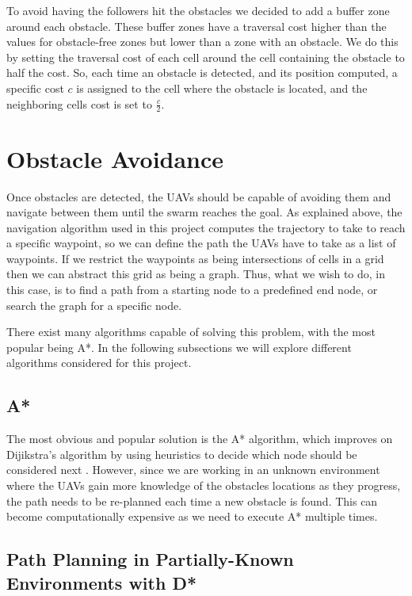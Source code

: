 To avoid having the followers hit the obstacles we decided to add a buffer zone around each obstacle. 
These buffer zones have a traversal cost higher than the values for obstacle-free zones but lower than
a zone with an obstacle. We do this by setting the traversal cost of each cell around the cell containing
the obstacle to half the cost. So, each time an obstacle is detected, and its position computed, a specific
cost $c$ is assigned to the cell where the obstacle is located, and the neighboring cells cost is set to 
$\frac{c}{2}$.

\section{Obstacle Avoidance}

Once obstacles are detected, the UAVs should be capable of avoiding them and navigate between them 
until the swarm reaches the goal. As explained above, the navigation algorithm used in this project computes
the trajectory to take to reach a specific waypoint, so we can define the path the UAVs have to take
as a list of waypoints. If we restrict the waypoints as being intersections of cells in a grid then
we can abstract this grid as being a graph. Thus, what we wish to do, in this case, is to find a path
from a starting node to a predefined end node, or search the graph for a specific node. 

There exist many algorithms capable of solving this problem, with the most popular being A*.
In the following subsections we will explore different algorithms considered for this project.


\subsection{A*}

The most obvious and popular solution is the A* algorithm, which improves on Dijikstra's algorithm
by using heuristics to decide which node should be considered next \autocite{ADA}. However, since we 
are working in an unknown environment where the UAVs gain more knowledge of the obstacles locations as
they progress, the path needs to be re-planned each time a new obstacle is found. This can become
computationally expensive as we need to execute A* multiple times. 

\subsection{Path Planning in Partially-Known Environments with D*}

